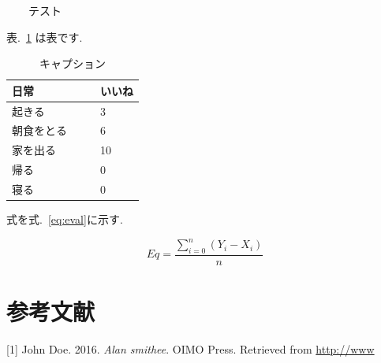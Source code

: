 \documentclass[10pt,a4paper,twocolumn]{jarticle}
\begin{document}
  　　テスト
  
  表.~\ref{tbl:t} は表です.
  
  \hypertarget{tbl:t}{}
  \begin{table}[ht]
  \centering
  
  \caption{\label{tbl:t}キャプション}
  
  \begin{tabular}{@{}ll@{}}
  \toprule
  
  日常 & いいね \\\midrule
  
  起きる & 3 \\
  朝食をとる & 6 \\
  家を出る & 10 \\
  帰る　　　　　 & 0 \\
  寝る & 0 \\
  
  \bottomrule
  \end{tabular}
  
  \end{table}
  
  式を式.~\ref{eq:eval}に示す.
  
  \begin{equation} Eq =  \frac{\sum_{i=0}^{n} (Y_i - X_i)} {n}  \label{eq:eval}\end{equation}
  
  \hypertarget{ux53c2ux8003ux6587ux732e}{%
  \section*{参考文献}\label{ux53c2ux8003ux6587ux732e}}
  
  \hypertarget{refs}{}
  \leavevmode\hypertarget{ref-ref}{}%
  {[}1{]} John Doe. 2016. \emph{Alan smithee}. OIMO Press. Retrieved from
  \url{http://www}



\end{document}

